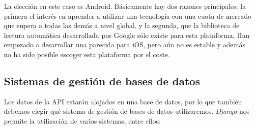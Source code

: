 La elección en este caso es Android. Básicamente hay dos razones principales:
la primera el interés en aprender a utilizar una tecnología con una cuota de
mercado que supera a todas las demás a nivel global, y la segunda, que la
biblioteca de lectura automática desarrollada por Google sólo existe para esta
plataforma. Han empezado a desarrollar una parecida para iOS, pero aún no es
estable y además no ha sido posible escoger esta plataforma por el coste.



\subsection{Sistemas de gestión de bases de datos}
\label{subsec:sistemas-bases-datos}

Los datos de la API estarán alojados en una base de datos, por lo que también
debemos elegir qué sistema de gestión de bases de datos utilizaremos.
\textit{Django} nos permite la utilización de varios sistemas, entre ellos:


